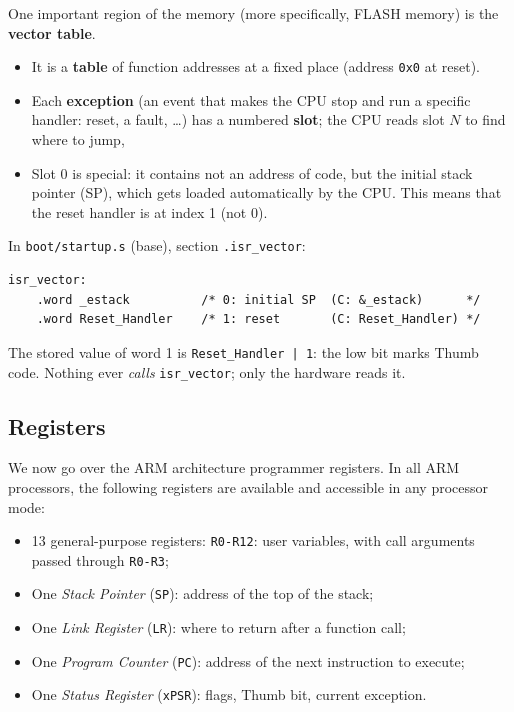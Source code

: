 \documentclass[a4paper,11pt]{article}
\begin{document}
One important region of the memory (more specifically, FLASH memory) is the \textbf{vector table}.

\begin{itemize}
	\item It is a \textbf{table} of function addresses at a fixed place (address
	      \texttt{0x0} at reset).

	\item Each \textbf{exception} (an event that makes the CPU stop and
	      run a specific handler: reset, a fault, \ldots) has a numbered
	      \textbf{slot}; the CPU reads slot $N$ to find where to jump,

	\item Slot 0 is special: it contains not an address of code, but the
	      initial stack pointer (SP), which gets loaded automatically by the CPU. This means that the reset handler is at index 1 (not 0).
\end{itemize}

In \texttt{boot/startup.s} (base), section \texttt{.isr\_vector}:

\begin{lstlisting}[language={arm}]
isr_vector:
    .word _estack          /* 0: initial SP  (C: &_estack)      */
    .word Reset_Handler    /* 1: reset       (C: Reset_Handler) */
\end{lstlisting}

The stored value of word 1 is \texttt{Reset\_Handler | 1}: the low bit
marks Thumb code. Nothing ever \emph{calls} \texttt{isr\_vector}; only
the hardware reads it.

\subsection{Registers}

We now go over the ARM architecture programmer registers.
In all ARM processors, the following registers are available and accessible in any processor mode:
\begin{itemize}
	\item 13 general-purpose registers: \texttt{R0-R12}: user variables, with call arguments passed through \texttt{R0-R3};
	\item One \textit{Stack Pointer} (\texttt{SP}): address of the top of the stack;
	\item One \textit{Link Register} (\texttt{LR}): where to return after a function call;
	\item One \textit{Program Counter} (\texttt{PC}): address of the next instruction to execute;
	\item One \textit{Status Register} (\texttt{xPSR}): flags, Thumb bit, current exception.
\end{itemize}
\end{document}
